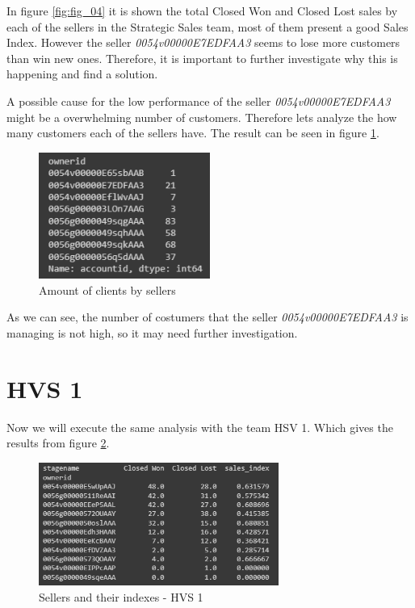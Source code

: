 \documentclass[]{report}
\begin{document}
In figure \ref{fig:fig_04} it is shown the total Closed Won and Closed Lost sales by each of the sellers in the Strategic Sales team, most of them present a good Sales Index. However the seller \textit{0054v00000E7EDFAA3} seems to lose more customers than win new ones. Therefore, it is important to further investigate why this is happening and find a solution.

A possible cause for the low performance of the seller \textit{0054v00000E7EDFAA3} might be a overwhelming number of customers. Therefore lets analyze the how many customers each of the sellers have. The result can be seen in figure \ref{fig:fig_05}.

\begin{figure}[htb]
	\centering
	\includegraphics[width=0.50\textwidth]{fig_05_customer_and_sellers}
	\caption{Amount of clients by sellers}
	\label{fig:fig_05}
\end{figure}

As we can see, the number of costumers that the seller \textit{0054v00000E7EDFAA3} is managing is not high, so it may need further investigation.

\section{HVS 1}

Now we will execute the same analysis with the team HSV 1. Which gives the results from figure \ref{fig:fig_06}.

\begin{figure}[htb]
	\centering
	\includegraphics[width=0.70\textwidth]{fig_06_sellers_hs1}
	\caption{Sellers and their indexes - HVS 1}
	\label{fig:fig_06}
\end{figure}
\end{document}
